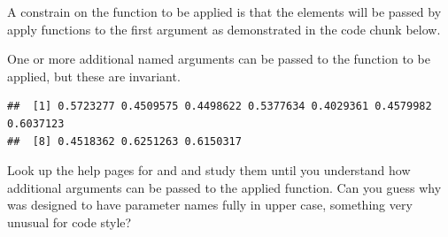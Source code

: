 \documentclass[krantz2]{krantz}\usepackage{knitr}%
\begin{document}
A constrain on the function to be applied is that the elements will be passed by apply functions to the first argument as demonstrated in the code chunk below.
\begin{knitrout}\footnotesize
{}\color{fgcolor}\begin{kframe}
\begin{alltt}
 \hlkwb{<-} \hlstd{(} \hlstd{=} \hlstd{,} \hlstd{) \{}
\hlstd{\}}
  \hlstd{=} \hlstd{,}   
\end{alltt}
\end{kframe}
\end{knitrout}

One or more additional named arguments can be passed to the function to be applied, but these are invariant.
\begin{knitrout}\footnotesize
{}\color{fgcolor}\begin{kframe}
\begin{alltt}
  \hlstd{=} \hlstd{,}    \hlstd{=} \hlstd{)}
\end{alltt}
\begin{verbatim}
##  [1] 0.5723277 0.4509575 0.4498622 0.5377634 0.4029361 0.4579982 0.6037123
##  [8] 0.4518362 0.6251263 0.6150317
\end{verbatim}
\end{kframe}
\end{knitrout}

\begin{playground}
Look up the help pages for  and  and study them until you understand how additional arguments can be passed to the applied function. Can you guess why  was designed to have parameter names fully in upper case, something very unusual for \Rlang code style?
\end{playground}
\end{document}
